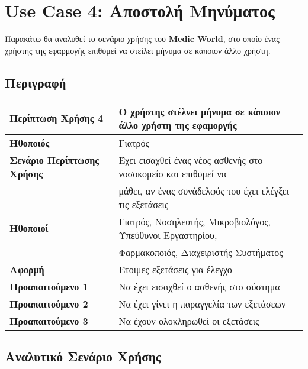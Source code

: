 \documentclass{article}
\newcommand\T{\rule{0pt}{2.6ex}}       %
\newcommand\B{\rule[-1.2ex]{0pt}{0pt}}
\begin{document}
\section{Use Case 4: Αποστολή Μηνύματος}

Παρακάτω θα αναλυθεί το σενάριο χρήσης του \textbf{Medic World}, στο οποίο ένας χρήστης της εφαρμογής επιθυμεί να στείλει μήνυμα σε κάποιον άλλο χρήστη.

\subsection{Περιγραφή}

\begin{center}
     \begin{tabular}{|l|l|}
     \hline
      \textbf{Περίπτωση Χρήσης 4} & Ο χρήστης στέλνει μήνυμα σε κάποιον άλλο χρήστη της εφαμοργής \T\B \\ 
      \hline
      \textbf{Ηθοποιός} & Γιατρός \T\B \\
      \hline
      \textbf{Σενάριο Περίπτωσης Χρήσης} & Έχει εισαχθεί ένας νέος ασθενής στο νοσοκομείο και επιθυμεί να \T \\& μάθει, αν ένας συνάδελφός του έχει ελέγξει τις εξετάσεις \B \\
      \hline
      \textbf{Ηθοποιοί} & Γιατρός, Νοσηλευτής, Μικροβιολόγος, Υπεύθυνοι Εργαστηρίου, \T \\& Φαρμακοποιός, Διαχειριστής Συστήματος \T\B \\
      \hline
      \textbf{Αφορμή} & Έτοιμες εξετάσεις για έλεγχο \T\B \\
      \hline
      \textbf{Προαπαιτούμενο 1} & Να έχει εισαχθεί ο ασθενής στο σύστημα \T\B \\
      \hline
      \textbf{Προαπαιτούμενο 2} & Να έχει γίνει η παραγγελία των εξετάσεων \T\B \\
      \hline
      \textbf{Προαπαιτούμενο 3} & Να έχουν ολοκληρωθεί οι εξετάσεις \T\B \\
      \hline
     \end{tabular}
 \end{center}
 
 \subsection{Αναλυτικό Σενάριο Χρήσης}
\end{document}
